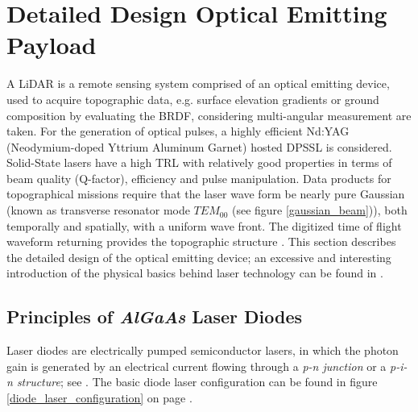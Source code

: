 \section{Detailed Design Optical Emitting Payload} 
\label{sec:DDlaser}
A \acs{LiDAR} is a remote sensing system comprised of an optical emitting device, used to acquire topographic data, e.g. surface elevation gradients or ground composition by evaluating the \acs{BRDF}, considering multi-angular measurement are taken. For the generation of optical pulses, a highly efficient Nd:YAG (Neodymium-doped Yttrium Aluminum Garnet) hosted \ac{DPSSL}  is considered. Solid-State \acp{laser} have a high \acf{TRL} with relatively good properties in terms of beam quality (Q-factor), efficiency and pulse manipulation. Data products for topographical missions require that the \ac{laser} wave form be nearly pure Gaussian (known as transverse resonator mode $TEM_{00}$ (see figure \ref{gaussian_beam})), both temporally and spatially, with a uniform wave front. The digitized time of flight waveform returning provides the topographic structure \cite{nd_yag_life}. This section describes the detailed design of the optical emitting device; an excessive and interesting introduction of the physical basics behind \acs{laser} technology can be found in \cite{laserfundamentals}. 

\subsection{Principles of \textit{AlGaAs} Laser Diodes}
\label{laser_diodes}
Laser diodes are electrically pumped semiconductor \acp{laser}, in which the photon gain is generated by an electrical current flowing through a \textit{p-n junction} or a \textit{p-i-n structure}; see \cite{lasertech}. The basic diode \acs{laser} configuration can be found in figure \ref{diode_laser_configuration} on page \pageref{diode_laser_configuration}.

